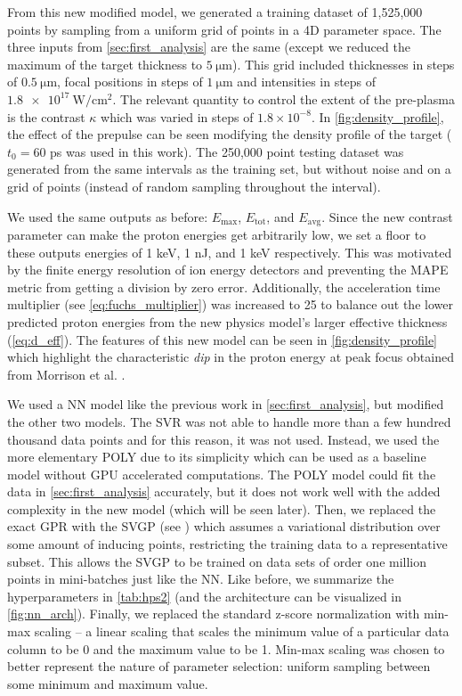 From this new modified model, we generated a training dataset of 1,525,000 points by sampling from a uniform grid of points in a 4D parameter space. The three inputs from \autoref{sec:first_analysis} are the same (except we reduced the maximum of the target thickness to $\SI{5}{\micro \meter}$). This grid included thicknesses in steps of $\SI{0.5}{\micro \meter}$, focal positions in steps of $\SI{1}{\micro \meter}$ and intensities in steps of $\SI{1.8e17}{\watt \per \centi \meter \squared}$. The relevant quantity to control the extent of the pre-plasma is the contrast $\kappa$ which was varied in steps of $1.8 \times 10^{-8}$. In \autoref{fig:density_profile}, the effect of the prepulse can be seen modifying the density profile of the target ($t_0 = 60$ ps was used in this work). The 250,000 point testing dataset was generated from the same intervals as the training set, but without noise and on a grid of points (instead of random sampling throughout the interval).

We used the same outputs as before: $E_\text{max}$, $E_\text{tot}$, and $E_\text{avg}$. Since the new contrast parameter can make the proton energies get arbitrarily low, we set a floor to these outputs energies of 1 keV, 1 nJ, and 1 keV respectively. This was motivated by the finite energy resolution of ion energy detectors and preventing the \gls{MAPE} metric from getting a division by zero error. Additionally, the acceleration time multiplier (see \autoref{eq:fuchs_multiplier}) was increased to 25 to balance out the lower predicted proton energies from the new physics model's larger effective thickness (\autoref{eq:d_eff}). The features of this new model can be seen in \autoref{fig:density_profile} which highlight the characteristic \emph{dip} in the proton energy at peak focus obtained from Morrison et al. \cite{Morrison_2018_NJoP}.

We used a \gls{NN} model like the previous work in \autoref{sec:first_analysis}, but modified the other two models. The \gls{SVR} was not able to handle more than a few hundred thousand data points and for this reason, it was not used. Instead, we used the more elementary \gls{POLY} due to its simplicity which can be used as a baseline model without \gls{GPU} accelerated computations. The \gls{POLY} model could fit the data in \autoref{sec:first_analysis} accurately, but it does not work well with the added complexity in the new model (which will be seen later). Then, we replaced the exact \gls{GPR} with the \gls{SVGP} (see \cite{Hensman_2014_SVGP}) which assumes a variational distribution over some amount of inducing points, restricting the training data to a representative subset. This allows the \gls{SVGP} to be trained on data sets of order one million points in mini-batches just like the \gls{NN}. Like before, we summarize the hyperparameters in \autoref{tab:hps2} (and the architecture can be visualized in \autoref{fig:nn_arch}).  Finally, we replaced the standard z-score normalization with min-max scaling -- a linear scaling that scales the minimum value of a particular data column to be 0 and the maximum value to be 1. Min-max scaling was chosen to better represent the nature of parameter selection: uniform sampling between some minimum and maximum value.

